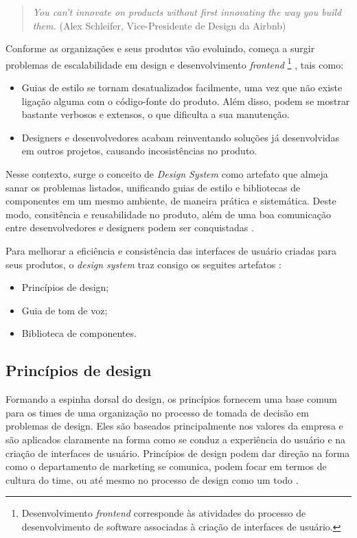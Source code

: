 \begin{quote}{\textit{You can’t innovate on products without first innovating the way you build them.}}
	(Alex Schleifer, Vice-Presidente de Design da Airbnb)
\end{quote}
 
Conforme as organizações e seus produtos vão evoluindo, começa a surgir problemas de escalabilidade em design e desenvolvimento \textit{frontend} \footnote{Desenvolvimento \textit{frontend} corresponde às atividades do processo de desenvolvimento de software associadas à criação de interfaces de usuário.} \cite{curtis2010modular}, tais como:

\begin{itemize}
  \item Guias de estilo se tornam desatualizados facilmente, uma vez que não existe ligação alguma com o código-fonte do produto. Além disso, podem se mostrar bastante verbosos e extensos, o que dificulta a sua manutenção.
  \item Designers e desenvolvedores acabam reinventando soluções já desenvolvidas em outros projetos, causando incosistências no produto.
\end{itemize}

Nesse contexto, surge o conceito de \textit{Design System} como artefato que almeja sanar os problemas listados, unificando guias de estilo e bibliotecas de componentes em um mesmo ambiente, de maneira prática e sistemática. Deste modo, consitência e reusabilidade no produto, além de uma boa comunicação entre desenvolvedores e designers podem ser conquistadas \cite{curtis2010modular}.

Para melhorar a eficiência e consistência das interfaces de usuário criadas para seus produtos, o \textit{design system} traz consigo os seguites artefatos \cite{ruissalo2018operating}:

\begin{itemize}
  \item Princípios de design;
  \item Guia de tom de voz;
  \item Biblioteca de componentes.
\end{itemize}

\subsection{Princípios de design}

Formando a espinha dorsal do design, os princípios fornecem uma base comum para os times de uma organização no processo de tomada de decisão em problemas de design. Eles são baseados principalmente nos valores da empresa e são aplicados claramente na forma como se conduz a experiência do usuário e na criação de interfaces de usuário. Princípios de design podem dar direção na forma como o departamento de marketing se comunica, podem focar em termos de cultura do time, ou até mesmo no processo de design como um todo \cite{kholmatova2017design}.

